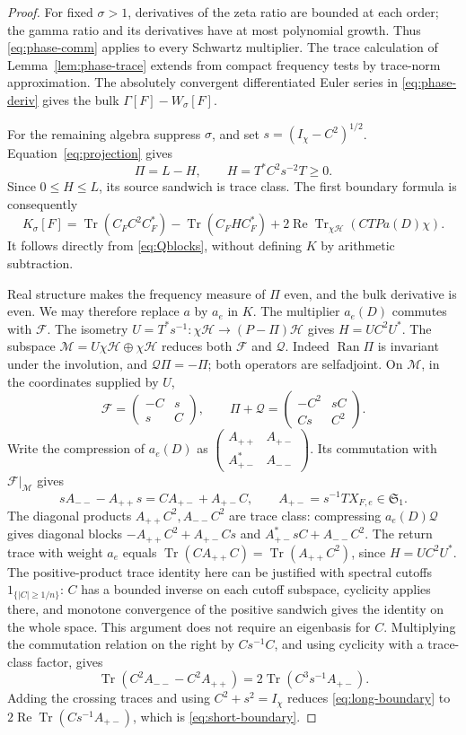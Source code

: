 \documentclass[11pt]{article}
\numberwithin{equation}{section}
\theoremstyle{definition}
\theoremstyle{remark}
\newcommand{\HH}{\mathcal H}
\newcommand{\Tr}{\operatorname{Tr}}
\newcommand{\Ran}{\operatorname{Ran}}
\newcommand{\Rea}{\operatorname{Re}}
\newcommand{\Id}{I}
\newcommand{\Fcal}{\mathcal F}
\newcommand{\Qcal}{\mathcal Q}
\newcommand{\Sone}{\mathfrak S_1}
\begin{document}
\begin{proof}
For fixed \(\sigma>1\), derivatives of the zeta ratio are bounded
at each order; the gamma ratio and its derivatives have at most
polynomial growth. Thus \eqref{eq:phase-comm} applies to every Schwartz
multiplier. The trace calculation of Lemma~\ref{lem:phase-trace}
extends from compact frequency tests by trace-norm approximation.
The absolutely convergent differentiated Euler series in
\eqref{eq:phase-deriv} gives the bulk
\(\Gamma[F]-W_\sigma[F]\).

For the remaining algebra suppress \(\sigma\), and set
\(s=(\Id_\chi-C^2)^{1/2}\).
Equation~\eqref{eq:projection} gives
\[
\Pi=L-H,\qquad H=T^*C^2s^{-2}T\ge0.
\]
Since \(0\le H\le L\), its source sandwich is trace class.
The first boundary formula is consequently
\begin{equation}\label{eq:long-boundary}
K_\sigma[F]=
\Tr(C_FC^2C_F^*)-\Tr(C_FHC_F^*)
+2\Rea\Tr_{\chi\HH}(CTPa(D)\chi).
\end{equation}
It follows directly from \eqref{eq:Qblocks}, without defining \(K\)
by arithmetic subtraction.

Real structure makes the frequency measure of \(\Pi\) even, and the
bulk derivative is even. We may therefore replace \(a\) by \(a_e\)
in \(K\). The multiplier \(a_e(D)\) commutes with \(\Fcal\).
The isometry \(U=T^*s^{-1}:\chi\HH\to(P-\Pi)\HH\)
gives \(H=UC^2U^*\). The subspace
\(\mathcal M=U\chi\HH\oplus\chi\HH\) reduces both \(\Fcal\) and
\(\Qcal\). Indeed \(\Ran\Pi\) is invariant under the involution,
and \(\Qcal\Pi=-\Pi\); both operators are selfadjoint.
On \(\mathcal M\), in the coordinates supplied by \(U\),
\[
\Fcal=\begin{pmatrix}-C&s\\s&C\end{pmatrix},
\qquad
\Pi+\Qcal=\begin{pmatrix}-C^2&sC\\Cs&C^2\end{pmatrix}.
\]
Write the compression of \(a_e(D)\) as
\(\begin{pmatrix}A_{++}&A_{+-}\\A_{+-}^*&A_{--}\end{pmatrix}\).
Its commutation with \(\Fcal|_{\mathcal M}\) gives
\[
sA_{--}-A_{++}s=CA_{+-}+A_{+-}C,\qquad
A_{+-}=s^{-1}TX_{F,e}\in\Sone.
\]
The diagonal products \(A_{++}C^2,A_{--}C^2\) are trace class:
compressing \(a_e(D)\Qcal\) gives diagonal blocks
\(-A_{++}C^2+A_{+-}Cs\) and \(A_{+-}^*sC+A_{--}C^2\).
The return trace with weight \(a_e\) equals
\(\Tr(CA_{++}C)=\Tr(A_{++}C^2)\), since \(H=UC^2U^*\).
The positive-product trace identity here can be justified with spectral
cutoffs \(1_{\{|C|\ge1/n\}}\): \(C\) has a bounded inverse on
each cutoff subspace, cyclicity applies there, and monotone convergence
of the positive sandwich gives the identity on the whole space.
This argument does not require an eigenbasis for \(C\).
Multiplying the commutation relation on the right by \(Cs^{-1}C\),
and using cyclicity with a trace-class factor, gives
\[
\Tr(C^2A_{--}-C^2A_{++})
=2\Tr(C^3s^{-1}A_{+-}).
\]
Adding the crossing traces and using \(C^2+s^2=\Id_\chi\) reduces
\eqref{eq:long-boundary} to
\(2\Rea\Tr(Cs^{-1}A_{+-})\), which is \eqref{eq:short-boundary}.


\end{proof}
\end{document}
